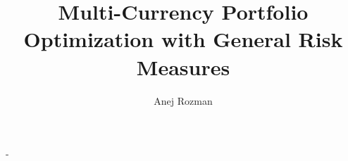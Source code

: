 \documentclass[11pt,a4paper,oneside]{memoir}
\title{Multi-Currency Portfolio Optimization with General Risk
Measures}
\author{Anej Rozman}
\date{}
\theoremstyle{nonumberplain}
\theoremstyle{plain}
\begin{document}
\frontmatter

\begin{titlingpage}
  \calccentering{\unitlength}
  \begin{adjustwidth*}{\unitlength-24pt}{-\unitlength-24pt}
    \maketitle
  \end{adjustwidth*}
\end{titlingpage}

\mainmatter

\setcounter{chapter}{4}



\backmatter



\end{document}
